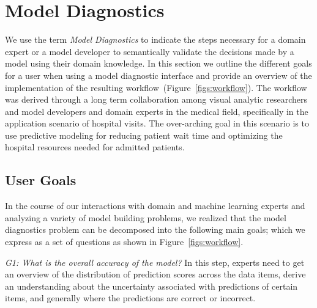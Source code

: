 \section{Model Diagnostics}
\label{sec:model-diagnostics}

We use the term \textit{Model Diagnostics} to indicate the steps necessary for a domain expert or a model developer to semantically validate the decisions made by a model using their domain knowledge. In this section we outline the different goals for a user when using a model diagnostic interface and provide an overview of the implementation of the resulting workflow~(Figure~\ref{figs:workflow}). 
The workflow was derived through a long term collaboration among visual analytic researchers and model developers and domain experts in the medical field, specifically in the application scenario of hospital visits. The over-arching goal in this scenario is to use predictive modeling for reducing patient wait time and optimizing the hospital resources needed for admitted patients.


\subsection{User Goals}

In the course of our interactions with domain and machine learning experts and analyzing a variety of model building problems, we realized that the model diagnostics problem can be decomposed into the following main goals; which we express as a set of questions as shown in Figure~\ref{figs:workflow}.  


\textit{G1: What is the overall accuracy of the model?} In this step, experts need to get an overview of the distribution of prediction scores across the data items, derive an understanding about the uncertainty associated with predictions of certain items, and generally where the predictions are correct or incorrect.


